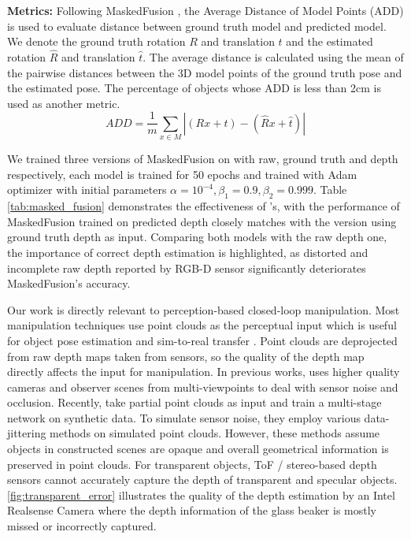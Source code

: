  \textbf{Metrics: } Following MaskedFusion \citep{maskedfusion}, the Average Distance of Model Points (ADD) is used to evaluate distance between ground truth model and predicted model. We denote the ground truth rotation $R$ and translation $t$ and the estimated rotation $\hat{R}$ and translation $\hat{t}$. The average distance
is calculated using the mean of the pairwise distances between the 3D model points of the ground truth pose and the estimated pose. The percentage of objects whose ADD is less than 2cm is used as another metric. 
\begin{equation}
    ADD = \frac{1}{m}\sum_{x \in M} | (Rx+t) - (\hat{R}x +\hat{t})|
\end{equation}

We trained three versions of MaskedFusion on \dataName with raw, ground truth and \algoName depth respectively, each model is trained for 50 epochs and trained with Adam optimizer\citep{kingma2017adam} with initial parameters $\alpha = 10^{-4}, \beta_1 = 0.9, \beta_2=0.999$. Table \ref{tab:masked_fusion} demonstrates the effectiveness of \algoName's, with the performance of MaskedFusion trained on \algoName predicted depth closely matches with the version using ground truth depth as input. Comparing both models with the raw depth one, the importance of correct depth estimation is highlighted, as distorted and incomplete raw depth reported by RGB-D sensor significantly deteriorates MaskedFusion's accuracy. 


Our work is directly relevant to perception-based closed-loop manipulation. Most manipulation techniques use point clouds as the perceptual input which is useful for object pose estimation and sim-to-real transfer \citep{mousavian20196dof, qin2019s4g, zhao2021regnet, yan2019dataefficient}. Point clouds are deprojected from raw depth maps taken from sensors, so the quality of the depth map directly affects the input for manipulation. In previous works,  \citep{mahler2017dexnet} uses higher quality cameras and \citep{pas2017grasp} observer scenes from multi-viewpoints to deal with sensor noise and occlusion. Recently,  \citep{qin2019s4g, zhao2021regnet} take partial point clouds as input and train a multi-stage network on synthetic data. To simulate sensor noise, they employ various data-jittering methods on simulated point clouds. However, these methods assume objects in constructed scenes are opaque and overall geometrical information is preserved in point clouds. For transparent objects, ToF / stereo-based depth sensors cannot accurately capture the depth of transparent and specular objects. \autoref{fig:transparent_error} illustrates the quality of the depth estimation by an Intel Realsense Camera where the depth information of the glass beaker is mostly missed or incorrectly captured. 

